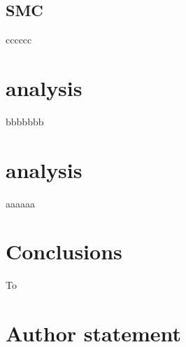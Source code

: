 \documentclass[a4paper,fleqn]{cas-dc} %
\begin{document}
		

		
		\subsection{SMC}
cccccc

		\section{analysis}
bbbbbbb




	    


	\section{analysis}
aaaaaa








	\section{Conclusions}
	To   

	\section*{Author statement}

	




	
	
	
	
\end{document}
